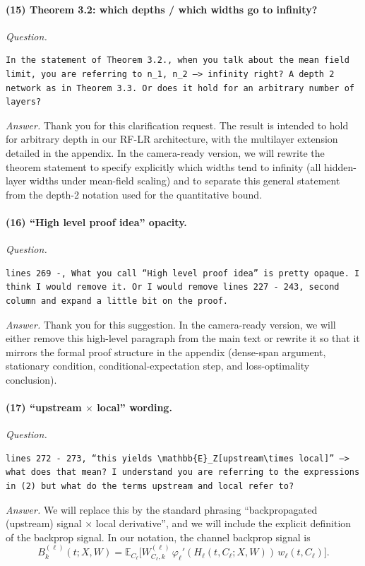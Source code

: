 \documentclass[11pt,a4paper]{article}
\begin{document}
\paragraph{(15) Theorem 3.2: which depths / which widths go to infinity?}
\textit{Question.}\par
\begin{verbatim}
In the statement of Theorem 3.2., when you talk about the mean field limit, you are referring to n_1, n_2 —> infinity right? A depth 2 network as in Theorem 3.3. Or does it hold for an arbitrary number of layers?
\end{verbatim}
\textit{Answer.} Thank you for this clarification request. The result is intended to hold for arbitrary depth in our RF-LR architecture, with the multilayer extension detailed in the appendix. In the camera-ready version, we will rewrite the theorem statement to specify explicitly which widths tend to infinity (all hidden-layer widths under mean-field scaling) and to separate this general statement from the depth-2 notation used for the quantitative bound.

\paragraph{(16) ``High level proof idea'' opacity.}
\textit{Question.}\par
\begin{verbatim}
lines 269 -, What you call “High level proof idea” is pretty opaque. I think I would remove it. Or I would remove lines 227 - 243, second column and expand a little bit on the proof.
\end{verbatim}
\textit{Answer.} Thank you for this suggestion. In the camera-ready version, we will either remove this high-level paragraph from the main text or rewrite it so that it mirrors the formal proof structure in the appendix (dense-span argument, stationary condition, conditional-expectation step, and loss-optimality conclusion).

\paragraph{(17) ``upstream $\times$ local'' wording.}
\textit{Question.}\par
\begin{verbatim}
lines 272 - 273, “this yields \mathbb{E}_Z[upstream\times local]” —> what does that mean? I understand you are referring to the expressions in (2) but what do the terms upstream and local refer to?
\end{verbatim}
\textit{Answer.} We will replace this by the standard phrasing ``backpropagated (upstream) signal $\times$ local derivative'', and we will include the explicit definition of the backprop signal. In our notation, the channel backprop signal is
\[
B_k^{(\ell)}(t;X,W)=\mathbb{E}_{C_\ell}\big[W^{(\ell)}_{C_\ell,k}\,\varphi_\ell'(H_\ell(t,C_\ell;X,W))\,w_\ell(t,C_\ell)\big].
\]
\end{document}
